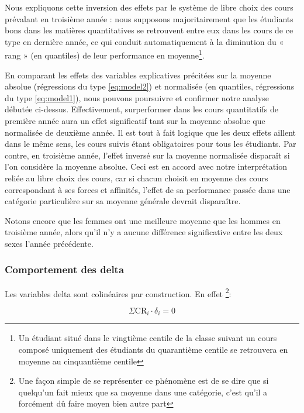 Nous expliquons cette inversion des effets par le système de libre choix des cours prévalant en troisième année : nous supposons majoritairement que les étudiants bons dans les matières quantitatives se retrouvent entre eux dans les cours de ce type en dernière année, ce qui conduit automatiquement à la diminution du « rang » (en quantiles) de leur performance en moyenne\footnote{Un étudiant situé dans le vingtième centile de la classe suivant un cours composé uniquement des étudiants du quarantième centile se retrouvera en moyenne au cinquantième centile}.

En comparant les effets des variables explicatives précitées sur la moyenne absolue (régressions du type \ref{eq:model2}) et normalisée (en quantiles, régressions du type \ref{eq:model1}), nous pouvons poursuivre et confirmer notre analyse débutée ci-dessus. Effectivement, surperformer dans les cours quantitatifs de première année aura un effet significatif tant sur la moyenne absolue que normalisée de deuxième année. Il est tout à fait logique que les deux effets aillent dans le même sens, les cours suivis étant obligatoires pour tous les étudiants. Par contre, en troisième année, l’effet inversé sur la moyenne normalisée disparaît si l’on considère la moyenne absolue. Ceci est en accord avec notre interprétation reliée au libre choix des cours, car si chacun choisit en moyenne des cours correspondant à ses forces et affinités, l’effet de sa performance passée dans une catégorie particulière sur sa moyenne générale devrait disparaître.

Notons encore que les femmes ont une meilleure moyenne que les hommes en troisième année, alors qu’il n’y a aucune différence significative entre les deux sexes l’année précédente.

\subsubsection{Comportement des delta}
Les variables delta sont colinéaires par construction. En effet \footnote{Une façon simple de se représenter ce phénomène est de se dire que si quelqu'un fait mieux que sa moyenne dans une catégorie, c'est qu'il a forcément dû faire moyen bien autre part}:

$$
\Sigma \text{CR}_i \cdot \delta_i = 0
$$

